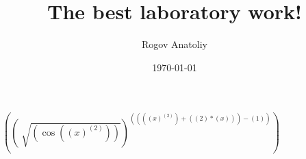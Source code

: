 \documentclass[12pt, letterpaper]{article}
\title{The best laboratory work!}
\author{Rogov Anatoliy}
\date{\today}
\begin{document}
\maketitle
\newpage
$({(\sqrt[]{(\cos{({(x)}^{(2)})})})}^{({({({(x)}^{(2)})}+{({(2)}*{(x)})})}-{(1)})})$
\end{document}
